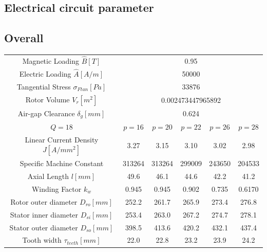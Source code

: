 \documentclass [a4 paper, 11pt, titlepage] {article}
\begin{document}
	
	
	
	
	
	
	
	\subsection{Electrical circuit parameter}
	
	

	

	

	

	
	
	
	
	\subsection{Overall}
	\begin{table}[h]
		\begin{center}
			\begin{tabular}{c|c|c|c|c|c}
				Magnetic Loading $\hat{B}[T]$ & \multicolumn{5}{c}{0.95} \\
				Electric Loading $\hat{A}[A/m]$ & \multicolumn{5}{c}{50000} \\
				Tangential Stress $\sigma_{Ftan}[Pa]$ & \multicolumn{5}{c}{33876} \\
				Rotor Volume $V_r [m^2]$ & \multicolumn{5}{c}{0.002473447965892} \\
				Air-gap Clearance $\delta_g [mm]$ & \multicolumn{5}{c}{0.624} \\
				\hline\hline
				$Q=18$ & $p=16$ & $p=20$ & $p=22$ & $p=26$ & $p=28$ \\
				\hline
				Linear Current Density $J [A/mm^2]$ & 3.27 & 3.15 & 3.10 & 3.02 & 2.98 \\
				Specific Machine Constant & 313264 & 313264 & 299009 & 243650 & 204533 \\
				Axial Length $l [mm]$ & 49.6 & 46.1 & 44.6 & 42.2 & 41.2 \\
				Winding Factor $k_w$ & 0.945 & 0.945 & 0.902 & 0.735 & 0.6170 \\
				Rotor outer diameter $D_{ro} [mm]$ & 252.2 & 261.7 & 265.9 & 273.4 & 276.8 \\
				Stator inner diameter $D_{si} [mm]$ & 253.4 & 263.0 & 267.2 & 274.7 & 278.1 \\
				Stator outer diameter $D_{so} [mm]$ & 398.5 & 413.6 & 420.2 & 432.1 & 437.4 \\
				Tooth width $\tau_{teeth} [mm]$ & \multirow{3}{4em}{22.0} & \multirow{3}{4em}{22.8} & \multirow{3}{4em}{23.2} & \multirow{3}{4em}{23.9} & \multirow{3}{4em}{24.2} \\

\end{tabular}
\end{center}
\end{table}
\end{document}
